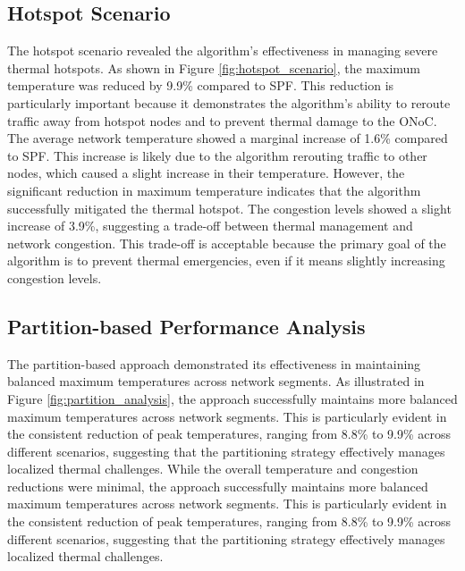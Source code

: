 \documentclass[12pt]{article}
\begin{document}
\subsection{Hotspot Scenario}
The hotspot scenario revealed the algorithm's effectiveness in managing severe thermal hotspots. As shown in Figure \ref{fig:hotspot_scenario}, the maximum temperature was reduced by 9.9\% compared to SPF. This reduction is particularly important because it demonstrates the algorithm's ability to reroute traffic away from hotspot nodes and to prevent thermal damage to the ONoC. The average network temperature showed a marginal increase of 1.6\% compared to SPF. This increase is likely due to the algorithm rerouting traffic to other nodes, which caused a slight increase in their temperature. However, the significant reduction in maximum temperature indicates that the algorithm successfully mitigated the thermal hotspot. The congestion levels showed a slight increase of 3.9\%, suggesting a trade-off between thermal management and network congestion. This trade-off is acceptable because the primary goal of the algorithm is to prevent thermal emergencies, even if it means slightly increasing congestion levels.

\subsection{Partition-based Performance Analysis}
The partition-based approach demonstrated its effectiveness in maintaining balanced maximum temperatures across network segments. As illustrated in Figure \ref{fig:partition_analysis}, the approach successfully maintains more balanced maximum temperatures across network segments. This is particularly evident in the consistent reduction of peak temperatures, ranging from 8.8\% to 9.9\% across different scenarios, suggesting that the partitioning strategy effectively manages localized thermal challenges. While the overall temperature and congestion reductions were minimal, the approach successfully maintains more balanced maximum temperatures across network segments. This is particularly evident in the consistent reduction of peak temperatures, ranging from 8.8\% to 9.9\% across different scenarios, suggesting that the partitioning strategy effectively manages localized thermal challenges.
\end{document}
